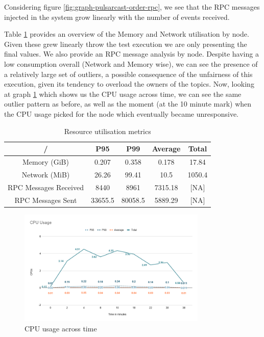 Considering figure \ref{fig:graph-pulsarcast-order-rpc}, we see that the RPC
messages injected in the system grow linearly with the number of events
received.

Table \ref{table:pulsarcast-order} provides an overview of the Memory and
Network utilisation by node. Given these grew linearly throw the test execution
we are only presenting the final values. We also provide an RPC message
analysis by node. Despite having a low consumption overall (Network and Memory
wise), we can see the presence of a relatively large set of outliers, a
possible consequence of the unfairness of this execution, given its tendency to
overload the owners of the topics. Now, looking at graph
\ref{fig:graph-pulsarcast-order-cpu} which shows us the CPU usage across time,
we can see the same outlier pattern as before, as well as the moment (at the 10
minute mark) when the CPU usage picked for the node which eventually became
unresponsive.

\begin{table}[!htb]
\caption{Resource utilisation metrics}
\label{table:pulsarcast-order}
  \begin{center}
   \begin{tabular}{|c| c c c c|} 
   \hline
   / & P95 & P99 & Average & Total \\ [0.5ex] 
   \hline\hline
   Memory (GiB) & 0.207 & 0.358 & 0.178 & 17.84 \\
   \hline
   Network (MiB) & 26.26 & 99.41 & 10.5 & 1050.4 \\
   \hline
   RPC Messages Received & 8440 & 8961 & 7315.18 & [NA] \\
   \hline
   RPC Messages Sent & 33655.5 & 80058.5 & 5889.29 & [NA] \\ [1ex] 
   \hline
  \end{tabular}
  \end{center}
\end{table}

\begin{figure}[!htb]
  \centering
  \includegraphics[width=0.8\textwidth]{img/graph-pulsarcast-order-cpu.png}
  \caption{CPU usage across time}
  \label{fig:graph-pulsarcast-order-cpu}
\end{figure}

